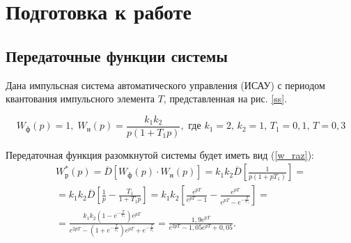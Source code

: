 



	
	
	\setcounter{page}{2}
	\tableofcontents
	\newpage
	
	\newcommand{\diag}[1]{\mathrm{diag}\,#1}
	\renewcommand{\sp}[1]{\mathrm{sp}\,#1}

	\section{Подготовка к работе}
	\subsection{Передаточные функции системы}
	
	Дана импульсная система автоматического управления (ИСАУ) с периодом квантования импульсного элемента $T$, представленная на рис. \ref{ss}. 

	\begin{center}
		\begin{equation*}
			W_\text{ф}(p) = 1,\; W_\text{н}(p) = \frac{k_1 k_2}{p(1+T_1 p)}, \text{ где } k_1 = 2,\, k_2 = 1,\, T_1 = 0,1,\, T = 0,3
			\label{system_pars}
		\end{equation*}
		\vspace{-0.75cm}
		\label{ss}
	\end{center}

	Передаточная функция разомкнутой системы будет иметь вид (\ref{w_raz}):
	\begin{multline}
		W^*_\text{р} (p) = \overline{D}[W_\text{ф}(p) \cdot W_\text{н}(p)] = k_1 k_2 \overline{D} \left[\frac{1}{p(1+pT_1)}\right] = \\ = k_1 k_2 \overline{D} \left[ \frac{1}{p} - \frac{T_1}{1+T_1 p} \right] = k_1 k_2 \left[ \frac{e^{pT}}{e^{pT} - 1} - \frac{e^{pT}}{e^{pT} - e^{-\frac{T}{T_1}}} \right] = \\ =
		\frac{k_1 k_2 \left(1- e^{-\frac{T}{T_1}}\right) e^{pT}}{e^{2pT} - \left(1 + e^{-\frac{T}{T_1}}\right)e^{pT} + e^{-\frac{T}{T_1}}} = \frac{1,9 e^{pT}}{e^{2pT} - 1,05 e^{pT} + 0,05}.
		\label{w_raz}
	\end{multline}

